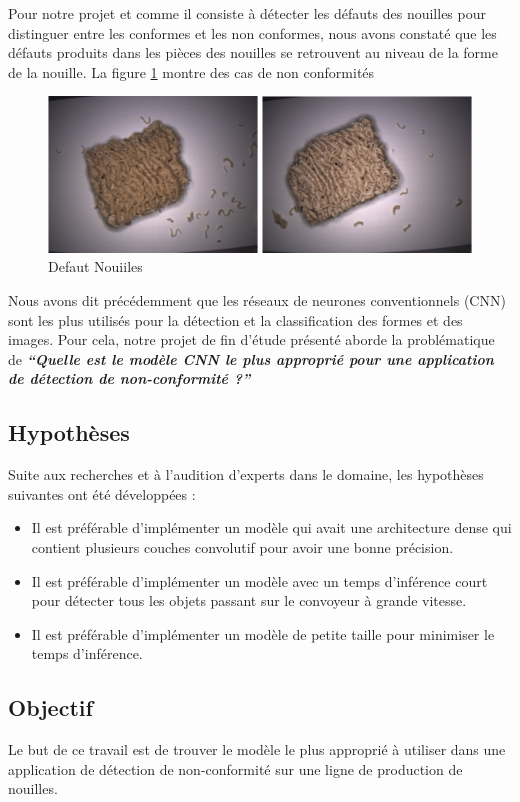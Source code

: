 Pour notre projet et comme il consiste à détecter les défauts des nouilles pour distinguer entre les conformes et les non conformes, nous avons constaté que les défauts produits dans les pièces des nouilles se retrouvent au niveau de la forme de la nouille. La figure \ref{DefautNouilles1} montre des cas de non conformités

\begin{figure}[h]
    \centering
    \includegraphics[width=13cm]{assets/PartTwo/Chapterone/DefautNouilles.png}
    \caption{Defaut Nouiiles}
    \label{DefautNouilles1}
    \end{figure}

Nous avons dit précédemment que les réseaux de neurones conventionnels (CNN) sont les plus utilisés pour la détection et la classification des formes et des images. 
Pour cela, notre projet de fin d’étude présenté aborde la problématique de \textbf{\textit{“Quelle est le modèle CNN le plus approprié pour une application de détection de non-conformité ?”}}
\subsection{Hypothèses}  
Suite aux recherches et à l'audition d'experts dans le domaine, les hypothèses suivantes ont été développées : 
\begin{itemize}
    \item Il est préférable d'implémenter un modèle qui avait une architecture dense qui contient plusieurs couches convolutif pour avoir une bonne précision.
    \item Il est préférable d'implémenter un modèle avec un temps d'inférence court pour détecter tous les objets passant sur le convoyeur à grande vitesse.
    \item Il est préférable d'implémenter un modèle de petite taille pour minimiser le temps d’inférence.
\end{itemize}
\newpage
\subsection{Objectif}
Le but de ce travail est de trouver le modèle le plus approprié à utiliser dans une application de détection de non-conformité sur une ligne de production de nouilles. 

